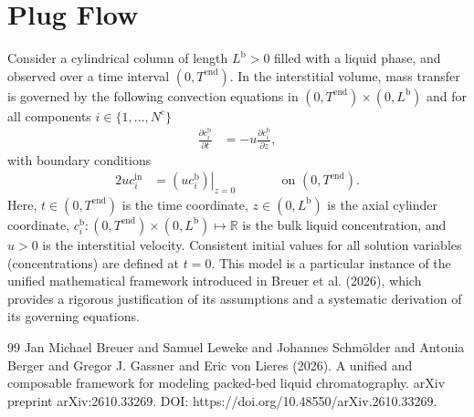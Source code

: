 \documentclass{article}
\begin{document}
\section*{Plug Flow}
Consider a cylindrical column of length $L^{\mathrm{b}} > 0$ filled with a liquid phase, and observed over a time interval $(0, T^{\mathrm{end}})$.
In the interstitial volume, mass transfer is governed by the following convection equations in $(0, T^{\mathrm{end}})\times (0, L^{\mathrm{b}})$ and for all components $i\in\{1, \dots, N^{\mathrm{c}} \}$
\begin{align}
    \frac{\partial c^{\mathrm{b}}_{i}}{\partial t}
    &= - u \frac{\partial c^{\mathrm{b}}_{i}}{\partial z},
\end{align}
with boundary conditions
\begin{alignat}{2}
    u c^{\mathrm{in}}_{i}
    &= \left.\left( u c^{\mathrm{b}}_{i} \right)\right|_{z=0}
    & & \qquad\text{on }(0, T^{\mathrm{end}}).
\end{alignat}
Here, $t\in (0, T^{\mathrm{end}})$ is the time coordinate, $z\in (0, L^{\mathrm{b}})$ is the axial cylinder coordinate, $c^{\mathrm{b}}_{i}\colon (0, T^{\mathrm{end}})\times (0, L^{\mathrm{b}}) \mapsto \mathbb{R}$ is the bulk liquid concentration, and $u> 0$ is the interstitial velocity.
Consistent initial values for all solution variables (concentrations) are defined at $t = 0$.
This model is a particular instance of the unified mathematical framework introduced in Breuer et al. (2026), which provides a rigorous justification of its assumptions and a systematic derivation of its governing equations.
\begin{thebibliography}{99}
     Jan Michael Breuer and Samuel Leweke and Johannes Schmölder and Antonia Berger and Gregor J. Gassner and Eric von Lieres (2026). A unified and composable framework for modeling packed-bed liquid chromatography. arXiv preprint arXiv:2610.33269. DOI: https://doi.org/10.48550/arXiv.2610.33269.
\end{thebibliography}
\end{document}
